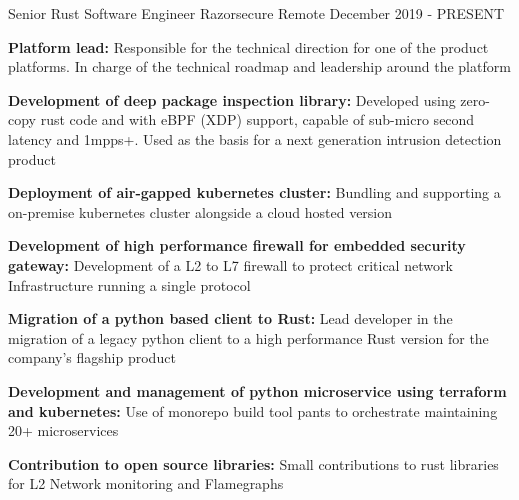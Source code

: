 

\begin{cventries}


  \cventry
    {Senior Rust Software Engineer} %
    {Razorsecure} %
    {Remote} %
    {December 2019 - PRESENT} %
    {
      \begin{cvitems} %
        \item {\color{graytext}\textbf{Platform lead:} Responsible for the technical direction for one of the product platforms. In charge of the technical roadmap and leadership around the platform }
        \item {\color{graytext}\textbf{Development of deep package inspection library:} Developed using zero-copy rust code and with eBPF (XDP) support, capable of sub-micro second latency and 1mpps+. Used as the basis for a next generation intrusion detection product }
        \item {\color{graytext}\textbf{Deployment of air-gapped kubernetes cluster:} Bundling and supporting a on-premise kubernetes cluster alongside a cloud hosted version}
        \item {\color{graytext}\textbf{Development of high performance firewall for embedded security gateway:} Development of a L2 to L7 firewall to protect critical network Infrastructure running a single protocol}
        \item {\color{graytext}\textbf{Migration of a python based client to Rust:} Lead developer in the migration of a legacy python client to a high performance Rust version for the company's flagship product}
        \item {\color{graytext}\textbf{Development and management of python microservice using terraform and kubernetes:} Use of monorepo build tool pants to orchestrate maintaining 20+ microservices }
        \item {\color{graytext}\textbf{Contribution to open source libraries:} Small contributions to rust libraries for L2 Network monitoring and Flamegraphs }
      \end{cvitems}
    }


\end{cventries}
